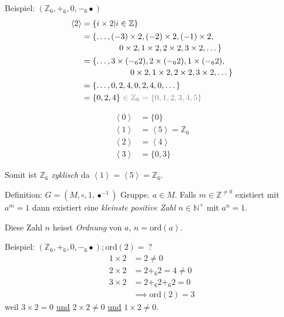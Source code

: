 \documentclass[a4paper, ngerman, landscape, fleqn]{article}
\begin{document}
\begin{multicols*}{3}
Beispiel: $(\mathbb{Z}_6, +_6, 0, -_6\bullet)$
\begin{align*}
    \left<2\right> &= \{ i \times 2 | i \in \mathbb{Z} \} \\
                   & \begin{multlined}
                       = \{ \dotsc, (-3) \times 2, (-2) \times 2, (-1) \times 2, \\
                           0 \times 2, 1 \times 2, 2 \times 2, 3 \times 2, \dotsc \}
                     \end{multlined} \\
                   & \begin{multlined}
                       = \{ \dotsc, 3 \times (-_6 2), 2 \times (-_6 2), 1 \times (-_6 2), \\
                       0 \times 2, 1 \times 2, 2 \times 2, 3 \times 2, \dotsc \}
                     \end{multlined} \\
                   &= \{ \dotsc, 0, 2, 4, 0, 2, 4, 0, \dotsc \} \\
                   &= \{ 0, 2, 4 \}\ \textcolor{gray}{\in \mathbb{Z}_6 = \{ 0, 1, 2, 3, 4, 5 \}}
\end{align*}

\begin{align*}
    \left< 0 \right> &= \{ 0 \} \\
    \left< 1 \right> &= \left< 5 \right> = \mathbb{Z}_6 \\
    \left< 2 \right> &= \left< 4 \right> \\
    \left< 3 \right> &= \{ 0, 3 \}
\end{align*}

Somit ist $\mathbb{Z}_6$ \emph{zyklisch} da $\left< 1 \right> = \left< 5 \right> = \mathbb{Z}_6$.

Definition: $G = (M, \circ, 1, \bullet^{-1})$ Gruppe. $a \in M$.
Falls $m \in \mathbb{Z}^{\neq 0}$ existiert mit $a^m = 1$ dann existiert eine \emph{kleinste positive Zahl} $n \in \mathbb{N}^+$ mit $a^n = 1$. 

Diese Zahl $n$ heisst \emph{Ordnung} von $a$, $n= \mathrm{ord}(a)$.

Beispiel: $(\mathbb{Z}_6, +_6, 0, -_6\bullet); \mathrm{ord}(2)=\ ?$
\begin{align*}
    1 \times 2 &= 2 \neq 0 \\
    2 \times 2 &= 2 +_6 2 = 4 \neq 0 \\
    3 \times 2 &= 2 +_6 2 +_6 2 = 0 \\
               &\implies \mathrm{ord}(2) = 3
\end{align*}
weil $3 \times 2 = 0$ \underline{und} $2 \times 2 \neq 0$ \underline{und} $1 \times 2 \neq 0$.


\end{multicols*}
\end{document}
